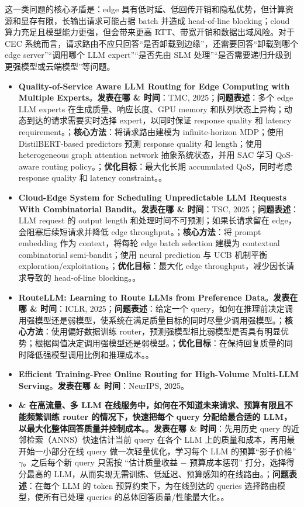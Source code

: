 \documentclass[a4paper,twocolumn,10pt]{ctexart}
\begin{document}
这一类问题的核心矛盾是：edge 具有低时延、低回传开销和隐私优势，但计算资源和显存有限，长输出请求可能占据 batch 并造成 head-of-line blocking；cloud 算力充足且模型能力更强，但会带来更高 RTT、带宽开销和数据出域风险。对于 CEC 系统而言，请求路由不应只回答“是否卸载到边缘”，还需要回答“卸载到哪个 edge server”“调用哪个 LLM expert”“是否先由 SLM 处理”“是否需要递归升级到更强模型或云端模型”等问题。



\begin{itemize}
\item \textbf{Quality-of-Service Aware LLM Routing for Edge Computing with Multiple Experts}。\textbf{发表在哪 \& 时间}：TMC, 2025；\textbf{问题表述}：多个 edge LLM experts 在生成质量、响应长度、GPU memory 和队列状态上异构；动态到达的请求需要实时选择 expert，以同时保证 response quality 和 latency requirement。；\textbf{核心方法}：将请求路由建模为 infinite-horizon MDP；使用 DistilBERT-based predictors 预测 response quality 和 length；使用 heterogeneous graph attention network 抽象系统状态，并用 SAC 学习 QoS-aware routing policy。；\textbf{优化目标}：最大化长期 accumulated QoS，同时考虑 response quality 和 latency constraint。。
\item \textbf{Cloud-Edge System for Scheduling Unpredictable LLM Requests With Combinatorial Bandit}。\textbf{发表在哪 \& 时间}：TSC, 2025；\textbf{问题表述}：LLM request 的 output length 和处理时间不可预测；如果长请求留在 edge，会阻塞后续短请求并降低 edge throughput。；\textbf{核心方法}：将 prompt embedding 作为 context，将每轮 edge batch selection 建模为 contextual combinatorial semi-bandit；使用 neural prediction 与 UCB 机制平衡 exploration/exploitation。；\textbf{优化目标}：最大化 edge throughput，减少因长请求导致的 head-of-line blocking。。
\item \textbf{RouteLLM: Learning to Route LLMs from Preference Data}。\textbf{发表在哪 \& 时间}：ICLR, 2025；\textbf{问题表述}：给定一个 query，如何在推理前决定调用强模型还是弱模型，使系统在满足质量目标的同时尽量少调用强模型。；\textbf{核心方法}：使用偏好数据训练 router，预测强模型相比弱模型是否具有明显优势；根据阈值决定调用强模型还是弱模型。；\textbf{优化目标}：在保持回复质量的同时降低强模型调用比例和推理成本。。
\item \textbf{Efficient Training-Free Online Routing for High-Volume Multi-LLM Serving}。\textbf{发表在哪 \& 时间}：NeurIPS, 2025。
\item \textbf{\& 在高流量、多 LLM 在线服务中，如何在不知道未来请求、预算有限且不能频繁训练 router 的情况下，快速把每个 query 分配给最合适的 LLM，以最大化整体回答质量并控制成本。}。\textbf{发表在哪 \& 时间}：先用历史 query 的近邻检索（ANNS）快速估计当前 query 在各个 LLM 上的质量和成本，再用最开始一小部分在线 query 做一次轻量优化，学习每个 LLM 的预算“影子价格” $\gamma$。之后每个新 query 只需按 “估计质量收益 − 预算成本惩罚” 打分，选择得分最高的 LLM，从而实现无需训练、低延迟、预算感知的在线路由。；\textbf{问题表述}：在每个 LLM 的 token 预算约束下，为在线到达的 queries 选择路由模型，使所有已处理 queries 的总体回答质量/性能最大化。。

\end{itemize}
\end{document}
